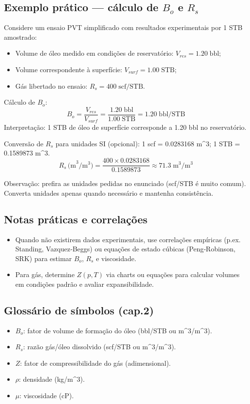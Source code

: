 \documentclass[11pt,a4paper]{article}
\begin{document}
\subsection{Exemplo prático — cálculo de $B_o$ e $R_s$}
Considere um ensaio PVT simplificado com resultados experimentais por 1 STB amostrado:
\begin{itemize}
\item Volume de óleo medido em condições de reservatório: $V_{res} = 1.20\;\text{bbl}$;
\item Volume correspondente à superfície: $V_{surf} = 1.00\;\text{STB}$;
\item Gás libertado no ensaio: $R_s = 400\;\text{scf/STB}$.
\end{itemize}

Cálculo de $B_o$:
$$
B_o = \frac{V_{res}}{V_{surf}} = \frac{1.20\;\text{bbl}}{1.00\;\text{STB}} = 1.20\;\text{bbl/STB}
$$
Interpretação: 1 STB de óleo de superfície corresponde a 1.20 bbl no reservatório.

Conversão de $R_s$ para unidades SI (opcional):
1 scf = 0.0283168 m^3; 1 STB = 0.1589873 m^3.
$$
R_s\,\text{(m}^3/\text{m}^3) = \frac{400\times0.0283168}{0.1589873} \approx 71.3\;\text{m}^3/\text{m}^3
$$

Observação: prefira as unidades pedidas no enunciado (scf/STB é muito comum). Converta unidades apenas quando necessário e mantenha consistência.

\subsection{Notas práticas e correlações}
\begin{itemize}
\item Quando não existirem dados experimentais, use correlações empíricas (p.ex. Standing, Vazquez‑Beggs) ou equações de estado cúbicas (Peng‑Robinson, SRK) para estimar $B_o$, $R_s$ e viscosidade.
\item Para gás, determine $Z(p,T)$ via charts ou equações para calcular volumes em condições padrão e avaliar expansibilidade.
\end{itemize}

\subsection{Glossário de símbolos (cap.2)}
\begin{itemize}
\item $B_o$: fator de volume de formação do óleo (bbl/STB ou m^3/m^3).
\item $R_s$: razão gás/óleo dissolvido (scf/STB ou m^3/m^3).
\item $Z$: fator de compressibilidade do gás (adimensional).
\item $\rho$: densidade (kg/m^3).
\item $\mu$: viscosidade (cP).
\end{itemize}
\end{document}
